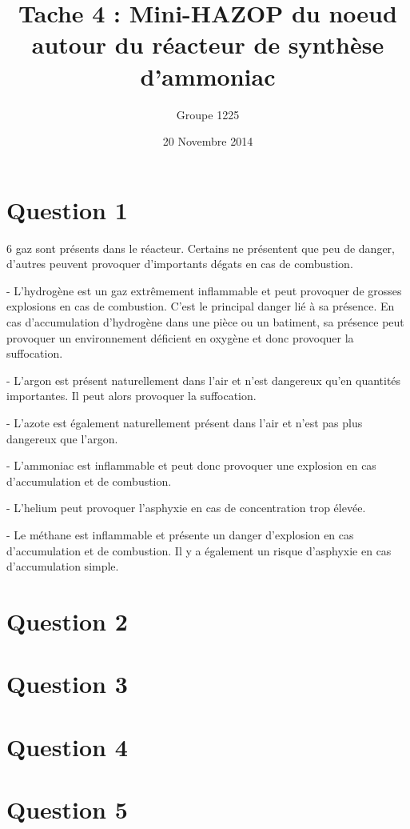 \documentclass[a4paper,oneside,12pt]{article}
\title{Tache 4 : Mini-HAZOP du noeud autour du réacteur de synthèse d'ammoniac}
\author{Groupe 1225}
\date{20 Novembre 2014}
\begin{document}
\maketitle

\section*{Question 1}

6 gaz sont présents dans le réacteur. Certains ne présentent que peu de danger, d'autres peuvent provoquer d'importants dégats en cas de combustion.

- L'hydrogène est un gaz extrêmement inflammable et peut provoquer de grosses explosions en cas de combustion. C'est le principal danger lié à sa présence.
En cas d'accumulation d'hydrogène dans une pièce ou un batiment, sa présence peut provoquer un environnement déficient en oxygène et donc provoquer la suffocation.

- L'argon est présent naturellement dans l'air et n'est dangereux qu'en quantités importantes. Il peut alors provoquer la suffocation.

- L'azote est également naturellement présent dans l'air et n'est pas plus dangereux que l'argon.

- L'ammoniac est inflammable et peut donc provoquer une explosion en cas d'accumulation et de combustion.

- L'helium peut provoquer l'asphyxie en cas de concentration trop élevée.

- Le méthane est inflammable et présente un danger d'explosion en cas d'accumulation et de combustion. Il y a également un risque d'asphyxie en cas d'accumulation simple.

\section*{Question 2}

\section*{Question 3}

\section*{Question 4}

\section*{Question 5}
\end{document}
